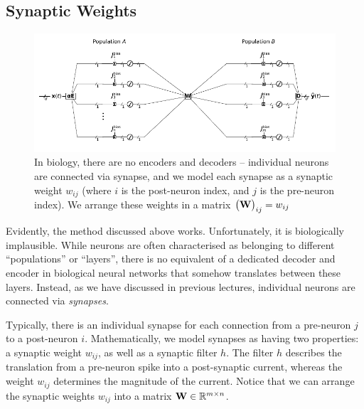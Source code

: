 \documentclass[10pt,letterpaper,oneside]{article}
\begin{document}
	\subsection{Synaptic Weights}

	\begin{figure}
		\includegraphics[width=\textwidth]{media/transformation_07.pdf}
		\caption{In biology, there are no encoders and decoders -- individual neurons are connected via synapse, and we model each synapse as a synaptic weight $w_{ij}$ (where $i$ is the post-neuron index, and $j$ is the pre-neuron index). We arrange these weights in a matrix $\big({\mathbf{W}} \big)_{ij} = w_{ij}$}
	\end{figure}
	
	Evidently, the method discussed above works. Unfortunately, it is biologically implausible. While neurons are often characterised as belonging to different \enquote{populations} or \enquote{layers}, there is no equivalent of a dedicated decoder and encoder in biological neural networks that somehow translates between these layers. Instead, as we have discussed in previous lectures, individual neurons are connected via \emph{synapses}.
	
	Typically, there is an individual synapse for each connection from a pre-neuron $j$ to a post-neuron $i$. Mathematically, we model synapses as having two properties: a synaptic weight $w_{ij}$, as well as a synaptic filter $h$. The filter $h$ describes the translation from a pre-neuron spike into a post-synaptic current, whereas the weight $w_{ij}$ determines the magnitude of the current. Notice that we can arrange the synaptic weights $w_{ij}$ into a matrix ${\mathbf{W}} \in \mathbb{R}^{m \times n}$.
\end{document}
